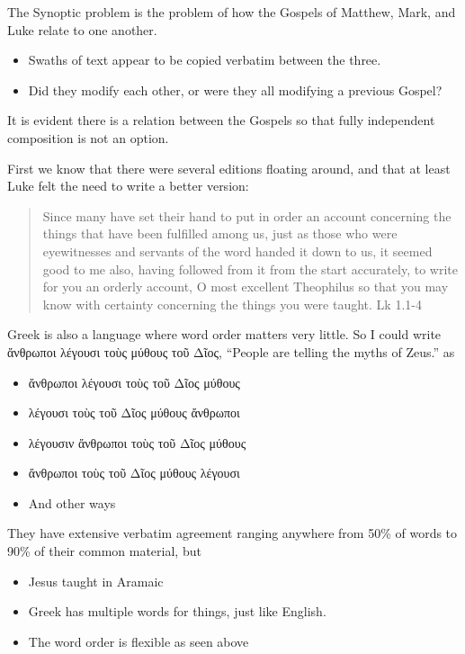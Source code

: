 \documentclass{beamer}
\begin{document}
\begin{frame}
  The Synoptic problem is the problem of how the Gospels of Matthew, Mark, and Luke relate to one another.\pause
  \begin{itemize}
	\item Swaths of text appear to be copied verbatim between the three.\pause
	\item Did they modify each other, or were they all modifying a previous Gospel?\pause
  \end{itemize}
  It is evident there is a relation between the Gospels so that fully independent composition is not an option.
\end{frame}

\begin{frame}
  First we know that there were several editions floating around, and that at least Luke felt the need to write a better version:
  \begin{quote}
	Since many have set their hand to put in order an account concerning the things that have been fulfilled among us,
	just as those who were eyewitnesses and servants of the word handed it down to us,
	it seemed good to me also, having followed from it from the start accurately, to write for you an orderly account, O most excellent Theophilus
	so that you may know with certainty concerning the things you were taught. Lk 1.1-4
  \end{quote}
\end{frame}

\begin{frame}
  Greek is also a language where word order matters very little.
  So I could write \textgreek{ἄνθρωποι λέγουσι τοὺς μύθους τοῦ Δῖος}, ``People are telling the myths of Zeus.'' as\pause
  \begin{itemize}
	\item \textgreek{ἄνθρωποι λέγουσι τοὺς τοῦ Δῖος μύθους}\pause
	\item \textgreek{λέγουσι τοὺς τοῦ Δῖος μύθους ἄνθρωποι}\pause
	\item \textgreek{λέγουσιν ἄνθρωποι τοὺς τοῦ Δῖος μύθους}\pause
	\item \textgreek{ἄνθρωποι τοὺς τοῦ Δῖος μύθους λέγουσι}\pause
	\item And other ways
  \end{itemize}
\end{frame}

\begin{frame}
  They have extensive verbatim agreement ranging anywhere from 50\% of words to 90\% of their common material, but\pause
  \begin{itemize}
	\item Jesus taught in Aramaic\pause
	\item Greek has multiple words for things, just like English.\pause
	\item The word order is flexible as seen above
  \end{itemize}
\end{frame}
\end{document}
